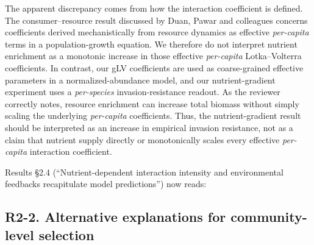 \responselabel
The apparent discrepancy comes from how the interaction coefficient is defined. The consumer--resource result discussed by Duan, Pawar and colleagues concerns coefficients derived mechanistically from resource dynamics as effective \emph{per-capita} terms in a population-growth equation. We therefore do not interpret nutrient enrichment as a monotonic increase in those effective \emph{per-capita} Lotka--Volterra coefficients. In contrast, our gLV coefficients are used as coarse-grained effective parameters in a normalized-abundance model, and our nutrient-gradient experiment uses a \emph{per-species} invasion-resistance readout. As the reviewer correctly notes, resource enrichment can increase total biomass without simply scaling the underlying \emph{per-capita} coefficients. Thus, the nutrient-gradient result should be interpreted as an increase in empirical invasion resistance, not as a claim that nutrient supply directly or monotonically scales every effective \emph{per-capita} interaction coefficient.

Results \S2.4 (``Nutrient-dependent interaction intensity and environmental feedbacks recapitulate model predictions'') now reads: 

\subsection*{R2-2. Alternative explanations for community-level selection}

